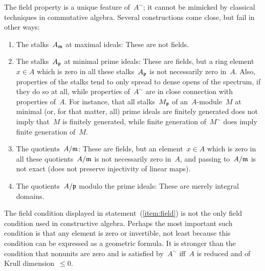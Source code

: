 \documentclass{ws-rv9x6}
\begin{document}
{The field property is a unique feature of~$A^\sim$; it cannot be mimicked by
classical techniques in commutative algebra. Several constructions come close,
but fail in other ways:
\begin{enumerate}
\item The stalks~$A_{\mathfrak{m}}$ at maximal ideals: These are not fields.
\item The stalks~$A_{\mathfrak{p}}$ at minimal prime ideals: These are fields, but a ring
element~$x \in A$ which is zero in all these stalks~$A_{\mathfrak{p}}$ is not necessarily
zero in~$A$. Also, properties of the stalks tend to only spread to
dense opens of the spectrum, if they do so at all, while properties of~$A^\sim$
are in close connection with properties of~$A$. For instance, that all
stalks~$M_{\mathfrak{p}}$ of an~$A$-module~$M$ at minimal (or, for that matter, all) prime ideals are finitely
generated does not imply that~$M$ is finitely generated, while finite
generation of~$M^\sim$ does imply finite generation of~$M$.
\item The quotients~$A/\mathfrak{m}$: These are fields, but an element~$x \in A$ which is
zero in all these quotients~$A/\mathfrak{m}$ is not necessarily zero in~$A$, and
passing to~$A/\mathfrak{m}$ is not exact (does not preserve injectivity of linear
maps).
\item The quotients~$A/\mathfrak{p}$ modulo the prime ideals: These are merely integral
domains.
\end{enumerate}

The field condition displayed in statement~(\ref{item:field}) is not the only
field condition used in constructive algebra. Perhaps the most important such
condition is that any element is zero or invertible, not least because this
condition can be expressed as a geometric formula. It is stronger than the
condition that nonunits are zero and is satisfied by~$A^\sim$ iff~$A$ is reduced
and of Krull dimension~$\leq 0$.

}
\end{document}

